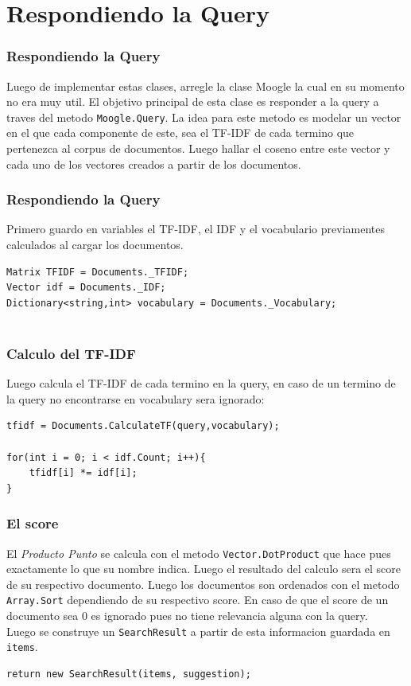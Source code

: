 \documentclass[11pt]{beamer}
\begin{document}
\section{Respondiendo la Query}
\begin{frame}
    \frametitle{Respondiendo la Query}

    Luego de implementar estas clases, arregle la clase Moogle la cual en su momento no era muy util. El objetivo principal de esta clase es responder a la query a traves del metodo \texttt{Moogle.Query}. La idea para este metodo es modelar un vector en el que cada componente de este, sea el TF-IDF de cada termino que pertenezca al corpus de documentos. Luego hallar el coseno entre este vector y cada uno de los vectores creados a partir de los documentos.
    
\end{frame}

\begin{frame}[fragile]
    \frametitle{Respondiendo la Query}
    
    Primero guardo en variables el TF-IDF, el IDF y el vocabulario previamentes calculados al cargar los documentos.
    
    \begin{Verbatim}[frame=single,fontsize=\small]
Matrix TFIDF = Documents._TFIDF;
Vector idf = Documents._IDF;
Dictionary<string,int> vocabulary = Documents._Vocabulary;
        
    \end{Verbatim}
\end{frame}

\begin{frame}[fragile]
    \frametitle{Calculo del TF-IDF}

    Luego calcula el TF-IDF de cada termino en la query, en caso de un termino de la query no encontrarse en vocabulary sera ignorado:

    \begin{Verbatim}[frame=single]
tfidf = Documents.CalculateTF(query,vocabulary);

for(int i = 0; i < idf.Count; i++){
    tfidf[i] *= idf[i];
}
\end{Verbatim}
\end{frame}
\begin{frame}[fragile]
    \frametitle{El score}
    El \emph{Producto Punto} se calcula con el metodo \texttt{Vector.DotProduct} que hace pues exactamente lo que su nombre indica. Luego el resultado del calculo sera el score de su respectivo documento. Luego los documentos son ordenados con el metodo \texttt{Array.Sort} dependiendo de su respectivo score. En caso de que el score de un documento sea 0 es ignorado pues no tiene relevancia alguna con la query.\linebreak\\
    Luego se construye un \texttt{SearchResult} a partir de esta informacion guardada en \texttt{items}.\\
\begin{Verbatim}[frame=single]
return new SearchResult(items, suggestion);
\end{Verbatim}
\end{frame}
\end{document}
